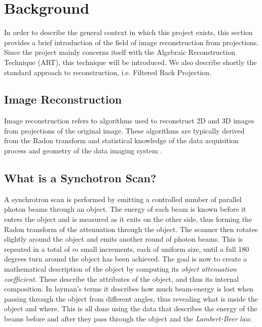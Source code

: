 \section{Background}
In order to describe the general context in which this project exists, this section provides a brief introduction of the field of image reconstruction from projections. Since the project mainly concerns itself with the Algebraic Reconstruction Technique (ART), this technique will be introduced. We also describe shortly the standard approach to reconstruction, i.e. Filtered Back Projection.

\subsection{Image Reconstruction}
Image reconstruction refers to algorithms used to reconstruct 2D and 3D images from projections of the original image. These algorithms are typically derived from the Radon transform and statistical knowledge of the data acquisition process and geometry of the data imaging system \cite{FCT}. 

\subsection{What is a Synchotron Scan?}
A synchrotron scan is performed by emitting a controlled number of parallel photon beams through an object. The energy of each beam is known before it enters the object and is measured as it exits on the other side, thus forming the Radon transform of the attenuation through the object. 
The scanner then rotates slightly around the object and emits another round of photon beams. This is repeated in a total of $m$ small increments, each of uniform size, until a full 180 degrees turn around the object has been achieved. 
The goal is now to create a mathematical description of the object by computing its \emph{object attenuation coefficient}. These describe the attributes of the object, and thus its internal composition. In layman's terms it describes how much beam-energy is lost when passing through the object from different angles, thus revealing what is inside the object and where. This is all done using the data that describes the energy of the beams before and after they pass through the object and the \emph{Lambert-Beer law}.


